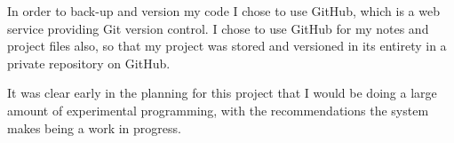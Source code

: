 
In order to back-up and version my code I chose to use GitHub\cite{GitHumSite}, which is a web service providing Git version control. I chose to use GitHub for my notes and project files also, so that my project was stored and versioned in its entirety in a private repository on GitHub.


It was clear early in the planning for this project that I would be doing a large amount of experimental programming, with the recommendations the system makes being a work in progress.
